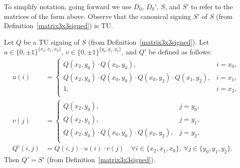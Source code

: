 \begin{definition}
\begin{center}
    \end{center}
    To simplify notation, going forward we use $D_{0}$, $D_{0}'$, $S$, and $S'$ to refer to the matrices of the form above.
    Observe that the canonical signing $S'$ of $S$ (from Definition~\ref{matrix3x3signed}) is TU.
\end{definition}

\begin{lemma}
    \label{Matrix.HasTuCanonicalSigning.toCanonicalSigning_submatrix3x3}
    \leanok
    Let $Q$ be a TU signing of $S$ (from Definition~\ref{matrix3x3signed}). Let $u \in \{0, \pm 1\}^{\{x_{2}, x_{1}, x_{0}\}}$, $v \in \{0, \pm 1\}^{\{y_{0}, y_{1}, y_{2}\}}$, and $Q'$ be defined as follows:
    \begin{align*}
        u(i) &= \begin{cases}
            Q (x_{2}, y_{0}) \cdot Q (x_{0}, y_{0}), & i = x_{0}, \\
            Q (x_{2}, y_{0}) \cdot Q (x_{0}, y_{0}) \cdot Q (x_{0}, y_{2}) \cdot Q (x_{1}, y_{2}), & i = x_{1}, \\
            1, & i = x_{2}, \\
        \end{cases} \\
        v(j) &= \begin{cases}
            Q (x_{2}, y_{0}), & j = y_{0}, \\
            Q (x_{2}, y_{1}), & j = y_{1}, \\
            Q (x_{2}, y_{0}) \cdot Q (x_{0}, y_{0}) \cdot Q (x_{0}, y_{2}), & j = y_{2}, \\
        \end{cases} \\
        Q' (i, j) &= Q (i, j) \cdot u(i) \cdot v(j) \quad \forall i \in \{x_{2}, x_{1}, x_{0}\}, \ \forall j \in \{y_{0}, y_{1}, y_{2}\}.
    \end{align*}
    Then $Q' = S'$ (from Definition~\ref{matrix3x3signed}).
\end{lemma}

